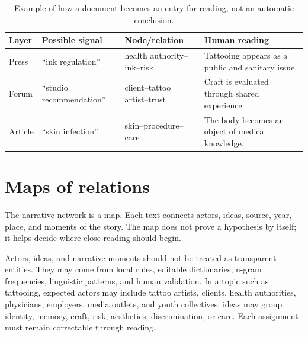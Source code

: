 \documentclass[11pt]{article}
\begin{document}
\begin{table}[H]
\centering
\small
\begin{tabular}{L{0.17\textwidth}L{0.24\textwidth}L{0.23\textwidth}L{0.24\textwidth}}
\toprule
\textbf{Layer} & \textbf{Possible signal} & \textbf{Node/relation} & \textbf{Human reading} \\
\midrule
Press & ``ink regulation'' & health authority--ink--risk & Tattooing appears as a public and sanitary issue. \\
Forum & ``studio recommendation'' & client--tattoo artist--trust & Craft is evaluated through shared experience. \\
Article & ``skin infection'' & skin--procedure--care & The body becomes an object of medical knowledge. \\
\bottomrule
\end{tabular}
\caption{Example of how a document becomes an entry for reading, not an automatic conclusion.}
\label{tab:microcase-en}
\end{table}

\section{Maps of relations}

The narrative network is a map. Each text connects actors, ideas, source, year,
place, and moments of the story. The map does not prove a hypothesis by itself;
it helps decide where close reading should begin.

Actors, ideas, and narrative moments should not be treated as transparent
entities. They may come from local rules, editable dictionaries, n-gram
frequencies, linguistic patterns, and human validation. In a topic such as
tattooing, expected actors may include tattoo artists, clients, health
authorities, physicians, employers, media outlets, and youth collectives; ideas
may group identity, memory, craft, risk, aesthetics, discrimination, or care.
Each assignment must remain correctable through reading.
\end{document}
